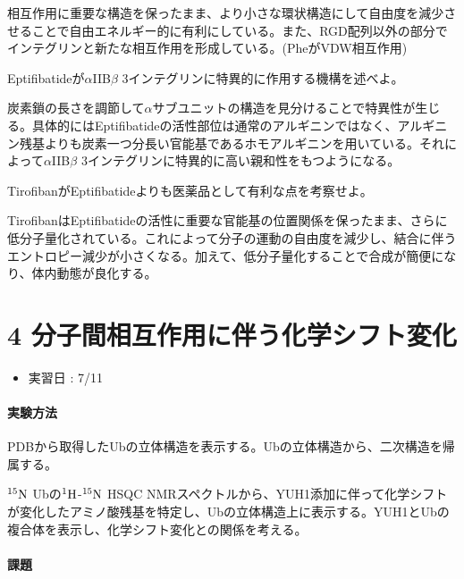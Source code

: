\documentclass[a4paper,papersize,dvipdfmx]{jsarticle}
\begin{document}
相互作用に重要な構造を保ったまま、より小さな環状構造にして自由度を減少させることで自由エネルギー的に有利にしている。また、RGD配列以外の部分でインテグリンと新たな相互作用を形成している。(PheがVDW相互作用)


\begin{tcolorbox}[colback=white,colbacktitle=black!10!white,coltitle=black,title={6}]
Eptifibatideが$\alpha$IIB$\beta$ 3インテグリンに特異的に作用する機構を述べよ。
\end{tcolorbox}

炭素鎖の長さを調節して$\alpha$サブユニットの構造を見分けることで特異性が生じる。具体的にはEptifibatideの活性部位は通常のアルギニンではなく、アルギニン残基よりも炭素一つ分長い官能基であるホモアルギニンを用いている。それによって$\alpha$IIB$\beta$ 3インテグリンに特異的に高い親和性をもつようになる。


\begin{tcolorbox}[colback=white,colbacktitle=black!10!white,coltitle=black,title={7}]
TirofibanがEptifibatideよりも医薬品として有利な点を考察せよ。
\end{tcolorbox}

TirofibanはEptifibatideの活性に重要な官能基の位置関係を保ったまま、さらに低分子量化されている。これによって分子の運動の自由度を減少し、結合に伴うエントロピー減少が小さくなる。加えて、低分子量化することで合成が簡便になり、体内動態が良化する。

\newpage


\part*{4 分子間相互作用に伴う化学シフト変化}

\begin{itemize}
\item 実習日 : 7/11

\end{itemize}
\subsection*{実験方法}
PDBから取得したUbの立体構造を表示する。Ubの立体構造から、二次構造を帰属する。

$\rm ^{15}N$ Ubの$\rm ^1H$-$\rm ^{15}N$ HSQC NMRスペクトルから、YUH1添加に伴って化学シフトが変化したアミノ酸残基を特定し、Ubの立体構造上に表示する。YUH1とUbの複合体を表示し、化学シフト変化との関係を考える。

\subsection*{課題}
\end{document}
